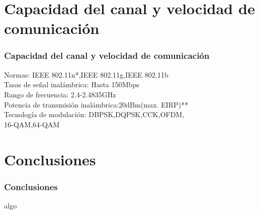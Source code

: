 \section{Capacidad del canal y velocidad de comunicaci\'on}
  \begin{frame}
    \frametitle{Capacidad del canal y velocidad de comunicaci\'on}       
      Normas: IEEE 802.11n*,IEEE 802.11g,IEEE 802.11b\\
      Tasas de señal inalámbrica: Hasta 150Mbps\\
      Rango de frecuencia: 2.4-2.4835GHz\\
      Potencia de transmisión inalámbrica:20dBm(max. EIRP)**\\
      Tecnología de modulación: DBPSK,DQPSK,CCK,OFDM,\\
      16-QAM,64-QAM\\
  \end{frame}
\section{Conclusiones}
  \begin{frame}
    \frametitle{Conclusiones}
    algo
  \end{frame}
